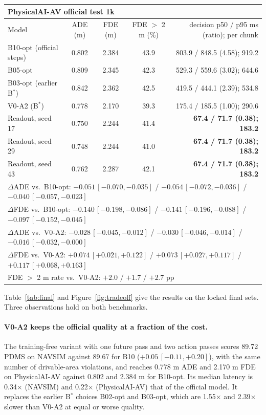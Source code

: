 \documentclass[10pt]{article}
\newcommand{\Bstar}{B$^{*}$}
\newcommand{\VA}[2]{V#1-A#2}
\begin{document}
\begin{table}[t]
\begin{center}
\vspace{6pt}
\begin{tabular}{lcccr}
\multicolumn{5}{l}{\textbf{PhysicalAI-AV official test 1k}} \\
\toprule
Model & ADE (m) & FDE (m) & FDE $>$ 2 m (\%) & decision p50 / p95 ms (ratio); per chunk \\
\midrule
B10-opt (official steps) & 0.802 & 2.384 & 43.9 & 803.9 / 848.5 (4.58); 919.2 \\
B05-opt & 0.809 & 2.345 & 42.3 & 529.3 / 559.6 (3.02); 644.6 \\
B03-opt (earlier \Bstar{}) & 0.842 & 2.362 & 42.5 & 419.5 / 444.1 (2.39); 534.8 \\
\VA{0}{2} (\Bstar{}) & 0.778 & 2.170 & 39.3 & 175.4 / 185.5 (1.00); 290.6 \\
Readout, seed 17 & 0.750 & 2.244 & 41.4 & \textbf{67.4 / 71.7 (0.38); 183.2} \\
Readout, seed 29 & 0.748 & 2.244 & 41.0 & \textbf{67.4 / 71.7 (0.38); 183.2} \\
Readout, seed 43 & 0.762 & 2.287 & 42.1 & \textbf{67.4 / 71.7 (0.38); 183.2} \\
\midrule
\multicolumn{5}{l}{$\Delta$ADE vs.\ B10-opt: $-0.051\,[-0.070,-0.035]$ / $-0.054\,[-0.072,-0.036]$ / $-0.040\,[-0.057,-0.023]$} \\
\multicolumn{5}{l}{$\Delta$FDE vs.\ B10-opt: $-0.140\,[-0.198,-0.086]$ / $-0.141\,[-0.196,-0.088]$ / $-0.097\,[-0.152,-0.045]$} \\
\multicolumn{5}{l}{$\Delta$ADE vs.\ \VA{0}{2}: $-0.028\,[-0.045,-0.012]$ / $-0.030\,[-0.046,-0.014]$ / $-0.016\,[-0.032,-0.000]$} \\
\multicolumn{5}{l}{$\Delta$FDE vs.\ \VA{0}{2}: $+0.074\,[+0.021,+0.122]$ / $+0.073\,[+0.027,+0.117]$ / $+0.117\,[+0.068,+0.163]$} \\
\multicolumn{5}{l}{FDE $>$ 2 m rate vs.\ \VA{0}{2}: $+2.0$ / $+1.7$ / $+2.7$ pp} \\
\bottomrule
\end{tabular}
\end{center}
\end{table}

Table~\ref{tab:final} and Figure~\ref{fig:tradeoff} give the results on the locked final sets. Three observations hold on both benchmarks.

\paragraph{\VA{0}{2} keeps the official quality at a fraction of the cost.} The training-free variant with one future pass and two action passes scores 89.72 PDMS on NAVSIM against 89.67 for B10 ($+0.05\,[-0.11,+0.20]$), with the same number of drivable-area violations, and reaches 0.778 m ADE and 2.170 m FDE on PhysicalAI-AV against 0.802 and 2.384 m for B10-opt. Its median latency is 0.34$\times$ (NAVSIM) and 0.22$\times$ (PhysicalAI-AV) that of the official model. It replaces the earlier \Bstar{} choices B02-opt and B03-opt, which are 1.55$\times$ and 2.39$\times$ slower than \VA{0}{2} at equal or worse quality.
\end{document}
